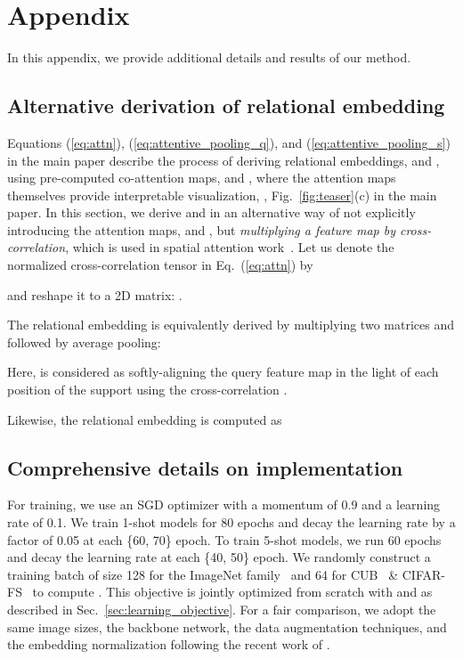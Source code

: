 \documentclass[10pt,twocolumn,letterpaper]{article}
\begin{document}
\clearpage
\renewcommand{\theequation}{a.\arabic{equation}}
\renewcommand{\thetable}{a.\arabic{table}}
\renewcommand{\thefigure}{a.\arabic{figure}}
\renewcommand*{\thefootnote}{\arabic{footnote}}
\renewcommand\thesection{\Alph{section}}
\setcounter{section}{0}
\section{Appendix}
In this appendix, we provide additional details and results of our method.

\subsection{Alternative derivation of relational embedding}
Equations (\ref{eq:attn}), (\ref{eq:attentive_pooling_q}), and (\ref{eq:attentive_pooling_s}) in the main paper describe the process of deriving relational embeddings,  and , using pre-computed co-attention maps,  and , where the attention maps themselves provide interpretable visualization, \eg, Fig.~\ref{fig:teaser}(c) in the main paper.
In this section, we derive  and  in an alternative way of not explicitly introducing the attention maps,  and , but \textit{multiplying a feature map by cross-correlation}, which is used in spatial attention work~\cite{sun2020mining, dualattentionnet, superglue}.
Let us denote the normalized cross-correlation tensor in Eq.~(\ref{eq:attn}) by 

and reshape it to a 2D matrix: .

The relational embedding  is equivalently derived by multiplying two matrices  and  followed by average pooling:

Here,  is considered as softly-aligning the query feature map  in the light of each position of the support using the cross-correlation .

Likewise, the relational embedding  is computed as 









\subsection{Comprehensive details on implementation}
For training, we use an SGD optimizer with a momentum of 0.9 and a learning rate of 0.1.
We train 1-shot models for 80 epochs and decay the learning rate by a factor of 0.05 at each \{60, 70\} epoch.
To train 5-shot models, we run 60 epochs and decay the learning rate at each \{40, 50\} epoch.
We randomly construct a training batch of size 128 for the ImageNet family~\cite{matchingnet, tieredimagenet} and 64 for CUB~\cite{cub} \& CIFAR-FS~\cite{cifarfs} to compute .
This objective is jointly optimized from scratch with  and  as described in Sec.~\ref{sec:learning_objective}.
For a fair comparison, we adopt the same image sizes, the backbone network, the data augmentation techniques, and the embedding normalization following the recent work of \cite{deepemd, feat}.
\end{document}

